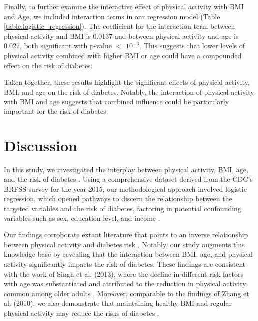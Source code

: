 \documentclass[11pt]{article}
\begin{document}
Finally, to further examine the interactive effect of physical activity with BMI and Age, we included interaction terms in our regression model (Table \ref{table:logistic_regression}). The coefficient for the interaction term between physical activity and BMI is 0.0137 and between physical activity and age is 0.027, both significant with p-value $<$ $10^{-6}$. This suggests that lower levels of physical activity combined with higher BMI or age could have a compounded effect on the risk of diabetes.

Taken together, these results highlight the significant effects of physical activity, BMI, and age on the risk of diabetes. Notably, the interaction of physical activity with BMI and age suggests that combined influence could be particularly important for the risk of diabetes.

\section*{Discussion}

In this study, we investigated the interplay between physical activity, BMI, age, and the risk of diabetes \cite{Bohn2015ImpactOP, Akter2014PrevalenceOD}. Using a comprehensive dataset derived from the CDC's BRFSS survey for the year 2015, our methodological approach involved logistic regression, which opened pathways to discern the relationship between the targeted variables and the risk of diabetes, factoring in potential confounding variables such as sex, education level, and income \cite{Singh2013TheAQ}. 

Our findings corroborate extant literature that points to an inverse relationship between physical activity and diabetes risk \cite{Zhao2020PhysicalAL}. Notably, our study augments this knowledge base by revealing that the interaction between BMI, age, and physical activity significantly impacts the risk of diabetes. These findings are consistent with the work of Singh et al. (2013), where the decline in different risk factors with age was substantiated and attributed to the reduction in physical activity common among older adults \cite{Singh2013TheAQ}. Moreover, comparable to the findings of Zhang et al. (2010), we also demonstrate that maintaining healthy BMI and regular physical activity may reduce the risks of diabetes \cite{Zhang2010PrevalenceOR}.
\end{document}
